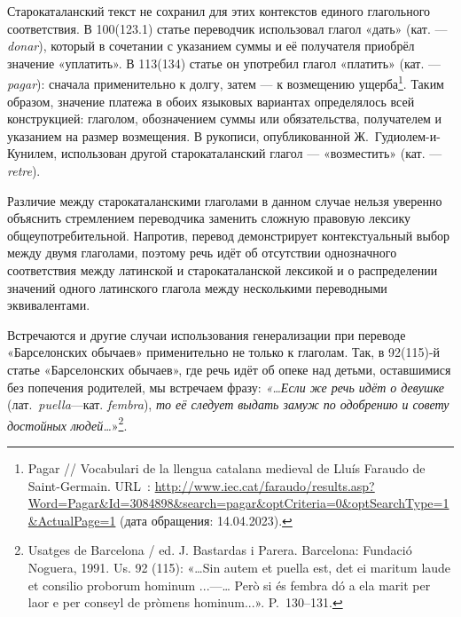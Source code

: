 Старокаталанский текст не сохранил для этих контекстов единого глагольного соответствия. В 100(123.1) статье переводчик использовал глагол «дать»\emph{ }(кат. --- \emph{donar}), который в сочетании с указанием суммы и её получателя приобрёл значение «уплатить». В 113(134) статье он употребил глагол «платить» (кат. --- \emph{pagar}): сначала применительно к долгу, затем --- к возмещению ущерба\footnote{Pagar // Vocabulari de la llengua catalana medieval de Lluís Faraudo de Saint-Germain. URL~: \url{http://www.iec.cat/faraudo/results.asp?Word=Pagar&Id=3084898&search=pagar&optCriteria=0&optSearchType=1&ActualPage=1} (дата обращения: 14.04.2023).}. Таким образом, значение платежа в обоих языковых вариантах определялось всей конструкцией: глаголом, обозначением суммы или обязательства, получателем и указанием на размер возмещения. В рукописи, опубликованной Ж.~Гудиолем-и-Кунилем, использован другой старокаталанский глагол --- «возместить» (кат. --- \emph{retre}).

Различие между старокаталанскими глаголами в данном случае нельзя уверенно объяснить стремлением переводчика заменить сложную правовую лексику общеупотребительной. Напротив, перевод демонстрирует контекстуальный выбор между двумя глаголами, поэтому речь идёт об отсутствии однозначного соответствия между латинской и старокаталанской лексикой и о распределении значений одного латинского глагола между несколькими переводными эквивалентами.

Встречаются и другие случаи использования генерализации при переводе «Барселонских обычаев» применительно не только к глаголам. Так, в 92(115)-й статье «Барселонских обычаев», где речь идёт об опеке над детьми, оставшимися без попечения родителей, мы встречаем фразу: \emph{«…Если же речь идёт о девушке }(лат.~\emph{puella}---кат. \emph{fembra}),\emph{ то её следует выдать замуж по одобрению и совету достойных }\emph{ }\emph{людей…}»\footnote{Usatges de Barcelona / ed. J. Bastardas i Parera. Barcelona: Fundació Noguera, 1991. Us. 92 (115): «…Sin autem et puella est, det ei maritum laude et consilio proborum hominum ...---… Però si és fembra dó a ela marit per laor e per conseyl de pròmens hominum...». P.~130--131.}.

